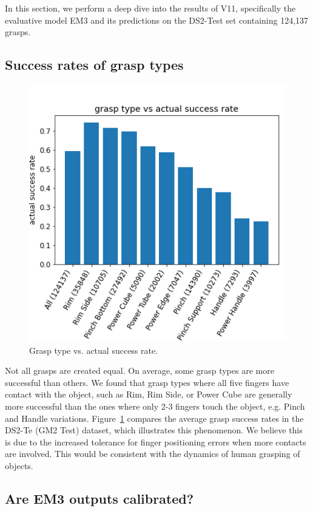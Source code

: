 
\noindent
In this section, we perform a deep dive into the results of V11, specifically the evaluative model EM3 and its predictions on the DS2-Test set containing 124,137 grasps. 

\subsection{Success rates of grasp types}
\noindent

\begin{figure}[h]
\centering 
\includegraphics[width=0.5\columnwidth]{images/post-analysis/Grasp_type_vs_success_prob.png}
\caption{Grasp type vs. actual success rate.}
\label{fig:post2}
\end{figure}

Not all grasps are created equal. On average, some grasp types are more successful than others. We found that grasp types where all five fingers have contact with the object, such as Rim, Rim Side, or Power Cube are generally more successful than the ones where only 2-3 fingers touch the object, e.g. Pinch and Handle variations. Figure~\ref{fig:post2} compares the average grasp success rates in the DS2-Te (GM2 Test) dataset, which illustrates this phenomenon. We believe this is due to the increased tolerance for finger positioning errors when more contacts are involved. This would be consistent with the dynamics of human grasping of objects. 

\subsection{Are EM3 outputs calibrated?}
\noindent

